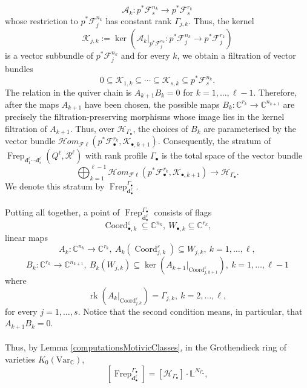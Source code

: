 \documentclass{amsart}
\theoremstyle{plain}
\numberwithin{equation}{section}
\theoremstyle{definition}
\theoremstyle{remark}
\begin{document}
	$$
	\mathcal A_k:
	p^*\mathcal F^{n_k}_s
	\longrightarrow
	p^*\mathcal F^{r_k}_s
	$$
	whose restriction to $p^*\mathcal F^{n_k}_j$
	has constant rank \(\Gamma_{j,k}\). Thus, the kernel
	$$
	\mathcal K_{j,k}:=
	\ker\left(\mathcal A_k|_{p^*\mathcal F^{n_k}_j}:p^*\mathcal F^{n_k}_j\longrightarrow
	p^*\mathcal F^{r_k}_j\right)
	$$
	is a vector subbundle of $p^*\mathcal F^{n_k}_j$ and for every
	$k$, we obtain a filtration of vector bundles
	$$
	0\subseteq \mathcal K_{1,k}\subseteq\cdots\subseteq \mathcal K_{s,k}\subseteq p^*\mathcal F^{n_k}_s.
	$$
	The relation in the quiver chain is $A_{k+1}B_k=0$ for $k=1,\ldots,\ell-1$. Therefore, after the maps $A_{k+1}$ have been chosen, the possible maps
	$B_k:\mathbb C^{r_k}\to \mathbb C^{n_{k+1}}$
	are precisely the filtration-preserving morphisms whose image lies in the kernel filtration of $A_{k+1}$. Thus, over $\mathcal{H}_{\Gamma_\bullet}$, the choices of $B_k$ are parameterised by the vector bundle
	$\mathcal H om_{\mathcal F\ell}\left(p^*\mathcal F^{r_k}_\bullet,\mathcal K_{\bullet,k+1}\right)$.
	Consequently, the stratum of
	$\operatorname{Frep}_{\mathbf d^\ell_1\cdots\mathbf d^\ell_s}
	(Q^\ell,\mathcal R^\ell)$ with rank profile $\Gamma_\bullet$ is the total
	space of the vector bundle
	$$
	\bigoplus_{k=1}^{\ell-1}
	\mathcal H om_{\mathcal F\ell}
	\left(
	p^*\mathcal F^{r_k}_\bullet,
	\mathcal K_{\bullet,k+1}
	\right)
	\longrightarrow
	\mathcal{H}_{\Gamma_\bullet}.
	$$
	We denote this stratum by $\operatorname{Frep}^{\Gamma_\bullet}_{\mathbf{d}^\ell_\bullet}$. 
	\\
	\\
	Putting all together, a point of $\operatorname{Frep}^{\Gamma_\bullet}_{\mathbf{d}^\ell_\bullet}$ consists of flags
	$$
	\operatorname{Coord}_{\bullet,k}^{\varepsilon}\subseteq \mathbb C^{n_k},
	\ W_{\bullet,k}\subseteq \mathbb C^{r_k},
	$$
	linear maps
	$$
	A_k:\mathbb C^{n_k}\to \mathbb C^{r_k},\ A_k(\operatorname{Coord}_{j,k}^{\varepsilon})\subseteq W_{j,k}, \ k=1,\ldots,\ell,
	$$
	$$
	B_k:\mathbb C^{r_k}\to \mathbb C^{n_{k+1}}, \ B_k(W_{j,k})\subseteq \ker(A_{k+1}|_{\operatorname{Coord}_{j,k+1}^{\varepsilon}}), \ k=1,\ldots,\ell-1
	$$
	where
	$$
	\operatorname{rk}(A_k|_{\operatorname{Coord}_{j,k}^{\varepsilon}})=\Gamma_{j,k}, \ k=2,\ldots,\ell,
	$$
	for every $j=1,\ldots,s$. Notice that the second condition means, in particular, that $A_{k+1}B_k=0$. 
	\\
	\\
	Thus, by Lemma \ref{computationsMotivicClasses}, in the Grothendieck ring of varieties $K_0(\text{Var}_{\mathbb{C}})$,
	$$
	[\operatorname{Frep}^{\Gamma_\bullet}_{\mathbf{d}^\ell_\bullet}]
	=
	[\mathcal{H}_{\Gamma_\bullet}]\cdot
	\mathbb L^{N_{\Gamma_\bullet}},
	$$
\end{document}

